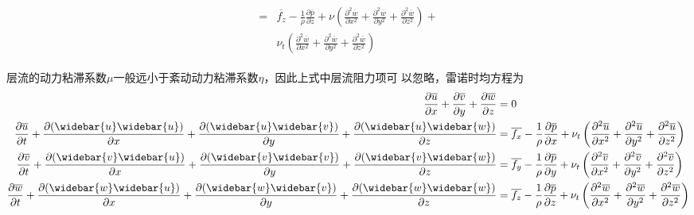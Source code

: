 \begin{equation}
\begin{gathered}
\begin{aligned}
      = 
      &
      \overline{f_{z}} -
      \frac{1}{\rho}\frac{\partial \overline{p}}{\partial z} 
      +
      \nu
      \left(
      \frac{\partial^{2} \overline{w}}{\partial x^{2}} +
      \frac{\partial^{2} \overline{w}}{\partial y^{2}} +
      \frac{\partial^{2} \overline{w}}{\partial z^{2}}
      \right)
      +
      \\
      &
      \nu_{t}
      \left(
      \frac{\partial^{2} \overline{w}}{\partial x^{2}} +
      \frac{\partial^{2} \overline{w}}{\partial y^{2}} +
      \frac{\partial^{2} \overline{w}}{\partial z^{2}}
      \right)
    \end{aligned}
  \end{gathered}
\end{equation}

层流的动力粘滞系数$\mu$一般远小于紊动动力粘滞系数$\eta$，因此上式中层流阻力项可
以忽略，雷诺时均方程为
\begin{subequations}
  \begin{align}
    \frac{\partial \overline{u}}{\partial x} +
    \frac{\partial \overline{v}}{\partial y} +
    \frac{\partial \overline{w}}{\partial z}
    &
    =
    0
    \label{EqRaeC}
    \\
    \frac{\partial \overline{u}}{\partial t} +
    \frac{\partial (\widebar{u}\widebar{u})}{\partial x} +
    \frac{\partial (\widebar{u}\widebar{v})}{\partial y} +
    \frac{\partial (\widebar{u}\widebar{w})}{\partial z}
    &
    =
    \overline{f_{x}} -
    \frac{1}{\rho}\frac{\partial \overline{p}}{\partial x} +
    \nu_{t}
    \left(
    \frac{\partial^{2} \overline{u}}{\partial x^{2}} +
    \frac{\partial^{2} \overline{u}}{\partial y^{2}} +
    \frac{\partial^{2} \overline{u}}{\partial z^{2}}
    \right)
    \label{EqRaeMex}
    \\
    \frac{\partial \overline{v}}{\partial t} +
    \frac{\partial (\widebar{v}\widebar{u})}{\partial x} +
    \frac{\partial (\widebar{v}\widebar{v})}{\partial y} +
    \frac{\partial (\widebar{v}\widebar{w})}{\partial z}
    &
    =
    \overline{f_{y}} -
    \frac{1}{\rho}\frac{\partial \overline{p}}{\partial y} +
    \nu_{t}
    \left(
    \frac{\partial^{2} \overline{v}}{\partial x^{2}} +
    \frac{\partial^{2} \overline{v}}{\partial y^{2}} +
    \frac{\partial^{2} \overline{v}}{\partial z^{2}}
    \right)
    \label{EqRaeMey}
    \\
    \frac{\partial \overline{w}}{\partial t} +
    \frac{\partial (\widebar{w}\widebar{u})}{\partial x} +
    \frac{\partial (\widebar{w}\widebar{v})}{\partial y} +
    \frac{\partial (\widebar{w}\widebar{w})}{\partial z}
    &
    =
    \overline{f_{z}} -
    \frac{1}{\rho}\frac{\partial \overline{p}}{\partial z} +
    \nu_{t}
    \left(
    \frac{\partial^{2} \overline{w}}{\partial x^{2}} +
    \frac{\partial^{2} \overline{w}}{\partial y^{2}} +
    \frac{\partial^{2} \overline{w}}{\partial z^{2}}
    \right) \label{EqRaeMez}
  \end{align}
\end{subequations}


